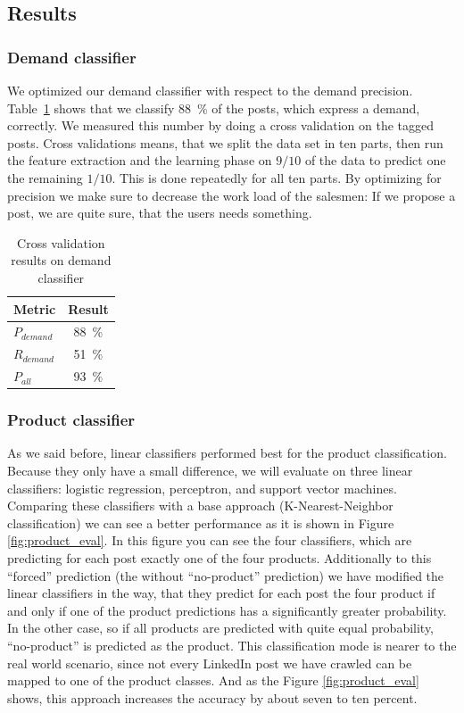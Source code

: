 \subsection{Results}
\label{sub:results}

\subsubsection{Demand classifier}
\label{ssub:demand_classifier}

We optimized our demand classifier with respect to the demand precision.
Table~\ref{table:demand_evaluation} shows that we classify 88~\% of the posts, which express a demand, correctly.
We measured this number by doing a cross validation on the tagged posts.
Cross validations means, that we split the data set in ten parts, then run the feature extraction and the learning phase on $9 / 10$ of the data to predict one the remaining $1 / 10$.
This is done repeatedly for all ten parts.
By optimizing for precision we make sure to decrease the work load of the salesmen: If we propose a post, we are quite sure, that the users needs something.

\begin{table}[h]
	\centering
	\begin{tabular}{lc}
		\hline
		\textbf{Metric} & \textbf{Result}  \\
		\hline
		\hline
		$P_{demand}$ & 88~\% \\
		\hline
		$R_{demand}$ & 51~\%  \\
		\hline
		$P_{all}$ & 93~\%  \\
		\hline
	\end{tabular}
	\caption{Cross validation results on demand classifier}
	\label{table:demand_evaluation}
\end{table}

\subsubsection{Product classifier}
\label{ssub:product_classifier}

As we said before, linear classifiers performed best for the product classification.
Because they only have a small difference, we will evaluate on three linear classifiers: logistic regression, perceptron, and support vector machines.
Comparing these classifiers with a base approach (K-Nearest-Neighbor classification) we can see a better performance as it is shown in Figure \ref{fig:product_eval}.
In this figure you can see the four classifiers, which are predicting for each post exactly one of the four products.
Additionally to this ``forced'' prediction (the without ``no-product'' prediction) we have modified the linear classifiers in the way, that they predict for each post the four product if and only if one of the product predictions has a significantly greater probability.
In the other case, so if all products are predicted with quite equal probability, ``no-product'' is predicted as the product.
This classification mode is nearer to the real world scenario, since not every LinkedIn post we have crawled can be mapped to one of the product classes.
And as the Figure \ref{fig:product_eval} shows, this approach increases the accuracy by about seven to ten percent.

